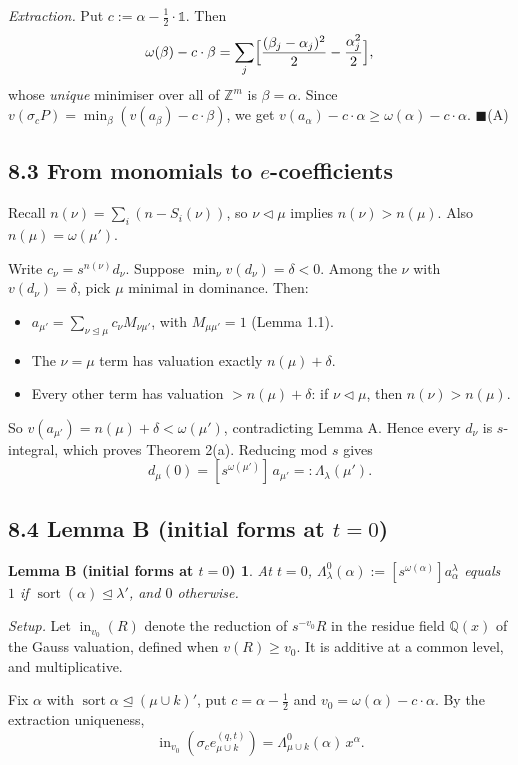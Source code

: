 \documentclass[11pt]{article}
\newtheorem*{lemmaB}{Lemma B (initial forms at $t=0$)}
\theoremstyle{definition}
\newcommand{\Q}{\mathbb{Q}}
\newcommand{\Z}{\mathbb{Z}}
\newcommand{\domd}{\trianglelefteq}
\newcommand{\sdomd}{\triangleleft}
\newcommand{\sort}{\operatorname{sort}}
\newcommand{\inn}{\operatorname{in}}
\newcommand{\one}{\mathbb{1}}
\begin{document}
\noindent\emph{Extraction.} Put $c := \alpha - \tfrac12\cdot\one$. Then
\[
\omega(\beta) - c\cdot\beta = \sum_j \Bigl[\frac{(\beta_j - \alpha_j)^2}{2} - \frac{\alpha_j^2}{2}\Bigr],
\]
whose \emph{unique} minimiser over all of $\Z^m$ is $\beta = \alpha$. Since $v(\sigma_c P) = \min_\beta(v(a_\beta) - c\cdot\beta)$, we get $v(a_\alpha) - c\cdot\alpha \ge \omega(\alpha) - c\cdot\alpha$. \hfill$\blacksquare$(A)

\subsection*{8.3 From monomials to $e$-coefficients}

Recall $n(\nu) = \sum_i (n - S_i(\nu))$, so $\nu \sdomd \mu$ implies $n(\nu) > n(\mu)$. Also $n(\mu) = \omega(\mu')$.

Write $c_\nu = s^{n(\nu)}d_\nu$. Suppose $\min_\nu v(d_\nu) = \delta < 0$. Among the $\nu$ with $v(d_\nu) = \delta$, pick $\mu$ minimal in dominance. Then:
\begin{itemize}
\item $a_{\mu'} = \sum_{\nu\domd\mu} c_\nu M_{\nu\mu'}$, with $M_{\mu\mu'} = 1$ (Lemma 1.1).
\item The $\nu = \mu$ term has valuation exactly $n(\mu) + \delta$.
\item Every other term has valuation $> n(\mu) + \delta$: if $\nu \sdomd \mu$, then $n(\nu) > n(\mu)$.
\end{itemize}
So $v(a_{\mu'}) = n(\mu) + \delta < \omega(\mu')$, contradicting Lemma A. Hence every $d_\nu$ is $s$-integral, which proves Theorem 2(a). Reducing mod $s$ gives
\[
d_\mu(0) = [s^{\omega(\mu')}]\, a_{\mu'} =: \Lambda_\lambda(\mu').
\]

\subsection*{8.4 Lemma B (initial forms at $t = 0$)}

\begin{lemmaB}
At $t = 0$, $\Lambda^0_\lambda(\alpha) := [s^{\omega(\alpha)}]a^\lambda_\alpha$ equals $1$ if $\sort(\alpha) \domd \lambda'$, and $0$ otherwise.
\end{lemmaB}

\noindent\emph{Setup.} Let $\inn_{v_0}(R)$ denote the reduction of $s^{-v_0}R$ in the residue field $\Q(x)$ of the Gauss valuation, defined when $v(R) \ge v_0$. It is additive at a common level, and multiplicative.

Fix $\alpha$ with $\sort\alpha \domd (\mu\cup k)'$, put $c = \alpha - \tfrac12$ and $v_0 = \omega(\alpha) - c\cdot\alpha$. By the extraction uniqueness,
\[
\inn_{v_0}(\sigma_c e_{\mu\cup k}^{(q,t)}) = \Lambda^0_{\mu\cup k}(\alpha)\, x^\alpha.
\]
\end{document}
